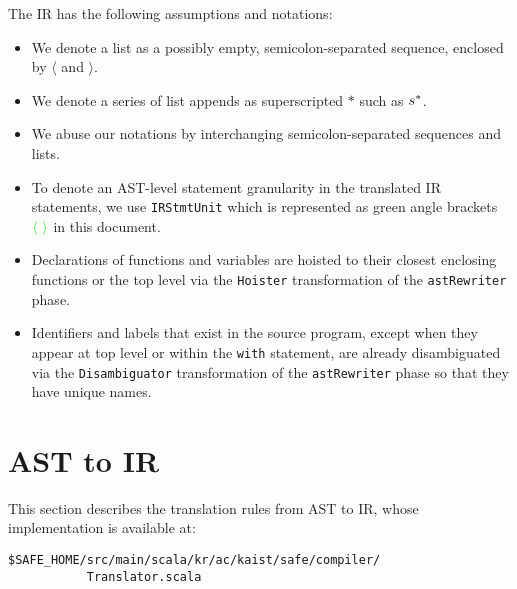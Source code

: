 The \safe IR has the following assumptions and notations:
\begin{itemize}
\item We denote a list as a possibly empty, semicolon-separated sequence, enclosed by $\langle$ and $\rangle$.
\item We denote a series of list appends as superscripted $*$ such as $s^*$.
\item We abuse our notations by interchanging semicolon-separated sequences and lists.
\item To denote an AST-level statement granularity in the translated IR statements,
we use {\tt IRStmtUnit} which is represented as green angle brackets {\ingreen ${\color{green}\langle}\ {\color{green}\rangle}$} in this document.
\item Declarations of functions and variables are hoisted to their closest enclosing functions
or the top level via the \verb!Hoister! transformation of the \verb!astRewriter! phase.
\item Identifiers and labels that exist in the source program,
except when they appear at top level or within the {\tt with} statement,
are already disambiguated via the \verb!Disambiguator! transformation of the \verb!astRewriter! phase
so that they have unique names.
\end{itemize}

\section{AST to IR}
This section describes the \safe translation rules from AST to IR,
whose implementation is available at:
\begin{verbatim}
$SAFE_HOME/src/main/scala/kr/ac/kaist/safe/compiler/
           Translator.scala
\end{verbatim}

